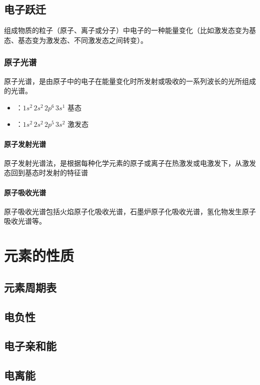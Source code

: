 \documentclass[a4paper]{article}
\begin{document}
	\subsection{电子跃迁}
	组成物质的粒子（原子、离子或分子）中电子的一种能量变化（比如激发态变为基态、基态变为激发态、不同激发态之间转变）。
	\subsubsection{原子光谱}
	原子光谱，是由原子中的电子在能量变化时所发射或吸收的一系列波长的光所组成的光谱。
	\begin{itemize}
		\item {}：$1s^2\,2s^2\,2p^6\,3s^1$ 基态
		\item {}：$1s^2\,2s^2\,2p^5\,3s^2$ 激发态
	\end{itemize}
	\paragraph{原子发射光谱}
	原子发射光谱法，是根据每种化学元素的原子或离子在热激发或电激发下，从激发态回到基态时发射的特征谱
	\paragraph{原子吸收光谱}
	原子吸收光谱包括火焰原子化吸收光谱，石墨炉原子化吸收光谱，氢化物发生原子吸收光谱等。
	
	
	\clearpage
	\section{元素的性质}
	
	
	\subsection{元素周期表}
	
	
	\subsection{电负性}
	
	
	\subsection{电子亲和能}
	
	
	\subsection{电离能}
	
	
\end{document}
